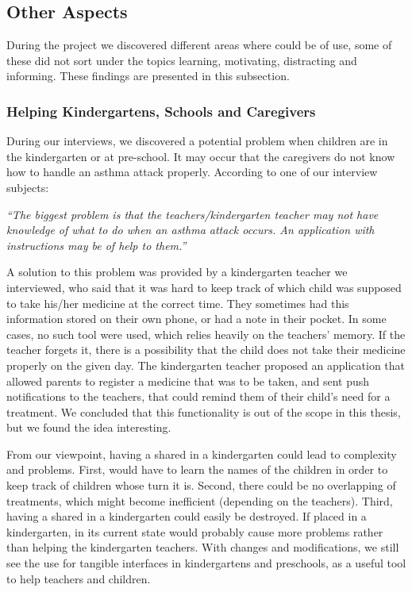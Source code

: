 \subsection{Other Aspects}
\label{sec:otheraspects}
During the project we discovered different areas where \ab{} could be of use, some of these did not sort under the topics learning, motivating, distracting and informing. These findings are presented in this subsection.


\subsubsection{Helping Kindergartens, Schools and Caregivers}
\label{sec:helpingkindergartenschoolandcaregivers}
During our interviews, we discovered a potential problem when children are in the kindergarten or at pre-school. It may occur that the caregivers do not know how to handle an asthma attack properly. According to one of our interview subjects: 

\textit{``The biggest problem is that the teachers/kindergarten teacher may not have knowledge of what to do when an asthma attack occurs. An application with instructions may be of help to them.''}

A solution to this problem was provided by a kindergarten teacher we interviewed, who said that it was hard to keep track of which child was supposed to take his/her medicine at the correct time. They sometimes had this information stored on their own phone, or had a note in their pocket. In some cases, no such tool were used, which relies heavily on the teachers' memory. If the teacher forgets it, there is a possibility that the child does not take their medicine properly on the given day. 
The kindergarten teacher proposed an application that allowed parents to register a medicine that was to be taken, and sent push notifications to the teachers, that could remind them of their child's need for a treatment. We concluded that this functionality is out of the scope in this thesis, but we found the idea interesting.         

From our viewpoint, having a shared \buddy{} in a kindergarten could lead to complexity and problems. First, \buddy{} would have to learn the names of the children in order to keep track of children whose turn it is. Second, there could be no overlapping of treatments, which might become inefficient (depending on the teachers). Third, having a shared \buddy{} in a kindergarten could easily be destroyed. If placed in a kindergarten, \buddy{} in its current state would probably cause more problems rather than helping the kindergarten teachers. With changes and modifications, we still see the use for tangible interfaces in kindergartens and preschools, as a useful tool to help teachers and children.    


